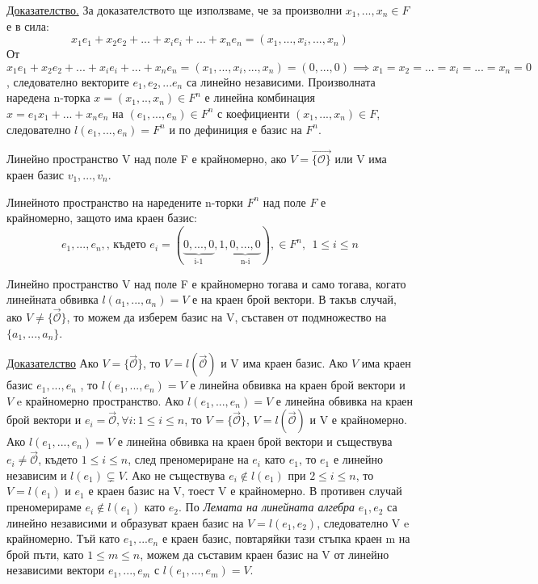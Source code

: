 \documentclass{article}
\newcommand*{\nullvec}{\vec{\mathcal{O}}}
\begin{document}
\underline{Доказателство.} За доказателството ще използваме, че за произволни $x_1,...,x_n \in F$
е в сила:
\[
    x_1e_1+x_2e_2+...+x_ie_i+...+x_ne_n=(x_1,...,x_i,...,x_n)
\]
От $x_1e_1+x_2e_2+...+x_ie_i+...+x_ne_n=(x_1,...,x_i,...,x_n)=(0,...,0)\implies x_1=x_2=...=x_i=...=x_n=0$, следователно векторите $e_1,e_2,...e_n$ са линейно независими.
Произволната наредена n-торка $x=(x_1,..,x_n)\in F^n$ е линейна комбинация $x=e_1x_1+...+x_ne_n$
на $(e_1,...,e_n)\in F^n$ с коефициенти $(x_1,...,x_n)\in F$, следователно $l(e_1,...,e_n)=F^n$ и
по дефиниция е базис на $F^n$.
\begin{tcolorbox}[title = Определение 5.3, colframe = red!70!black, colback = red!10!white]
    Линейно пространство V над поле F е крайномерно, ако $V=\vec{\{\mathcal{O}\}}$ или V има краен
    базис $v_1,...,v_n$.
\end{tcolorbox}
\newpage
Линейното пространство на наредените n-торки $F^n$ над поле $F$ е \\
крайномерно, защото има краен базис:
\[
    e_1,...,e_n,\text{, където } e_i=(\underbrace{0,...,0}_\text{i-1},1,\underbrace{0,...,0}_\text{n-i}),
    \in F^n, \ \ 1\leq i\leq n
\]
\begin{tcolorbox}[title = Твърдение 5.4, colframe = blue!70!black, colback = blue!10!white]
    Линейно пространство V над поле F е крайномерно тогава и само тогава, когато линейната обвивка
    $l(a_1,...,a_n)=V$ е на краен брой вектори. В такъв случай, ако $V\neq\{\vec{\mathcal{O}}\}$,
    то можем да изберем базис на V, съставен от подмножество на $\{a_1,...,a_n\}$.
\end{tcolorbox}
\underline{Доказателство} Ако  $V=\{\vec{\mathcal{O}}\}$, то $V=l(\nullvec)$ и V има краен базис.
Ако $V$ има краен базис $e_1,...,e_n$ , то $l(e_1,...,e_n)=V$ е линейна обвивка на краен брой вектори
и $V$ e крайномерно пространство.
Ако $l(e_1,...,e_n)=V$ е линейна обвивка на краен брой вектори и
$e_i=\nullvec , \forall i: 1\leq i\leq n$, то $V=\{\nullvec\}$, $V=l(\nullvec)$ и V е крайномерно.
Ако $l(e_1,...,e_n)=V$ е линейна обвивка на краен брой вектори и съществува $e_i\neq\nullvec$,
където $1\leq i \leq n$, след преномериране на $e_i$ като $e_1$, то $e_1$ е линейно независим и
$l(e_1)\subsetneq V$. Ако не съществува $e_i\notin l(e_1)$ при $2\leq i\leq n$, то $V=l(e_1)$ и $e_1$
е краен базис на V, тоест V е крайномерно. В противен случай преномерираме $e_i\notin l(e_1)$ като $e_2$.
По \emph{Лемата на линейната алгебра} $e_1, e_2$ са линейно независими и образуват краен базис на $V=l(e_1,e_2)$,
следователно V e крайномерно. Тъй като $e_1,...e_n$ е краен базис, повтаряйки тази стъпка краен m на брой
пъти, като $1\leq m \leq n$, можем да съставим краен базис на V от линейно независими вектори $e_1,...,e_m$ с $l(e_1,...,e_m)=V$.
\end{document}
